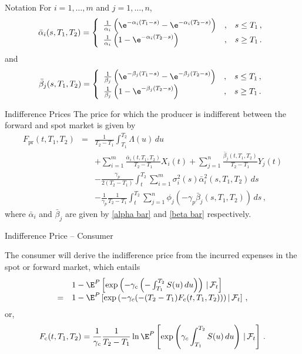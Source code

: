 {Notation}
For $i=1,\ldots,m$ and $j=1,\ldots,n$,
\begin{equation}\label{alpha bar}
\bar{\alpha}_i(s,T_1,T_2)=\left\{\begin{array}{lll}
\frac1{\alpha_i}\left(\e^{-\alpha_i(T_1-s)}-\e^{-\alpha_i(T_2-s)}\right) &
, &
s\leq T_1\,, \\
\frac1{\alpha_i}\left(1-\e^{-\alpha_i(T_2-s)}\right) & , & s\geq T_1\,.
\end{array}\right.
\end{equation}
and
\begin{equation}\label{beta bar}
\bar{\beta}_j(s,T_1,T_2)=\left\{\begin{array}{lll}
\frac1{\beta_j}\left(\e^{-\beta_j(T_1-s)}-\e^{-\beta_j(T_2-s)}\right) & ,
&
s\leq T_1\,, \\
\frac1{\beta_j}\left(1-\e^{-\beta_j(T_2-s)}\right) & , & s\geq T_1\,.
\end{array}\right.
\end{equation}

{Indifference Prices}
The price for which the producer is indifferent between the forward
and spot market is given by
\begin{eqnarray*}
F_{\text{pr}}(t,T_1,T_2)&=&\frac{1}{T_2-T_1}\int_{T_1}^{T_2}\Lambda(u)\,du\\
&&+\sum_{i=1}^m\frac{\bar{\alpha}_i(t,T_1,T_2)}{T_2-T_1}X_i(t)+\sum_{j=1}^n
\frac{\bar{\beta}_j(t,T_1,T_2)}{T_2-T_1}Y_j(t) \\
&&-\frac{\gamma_p}{2(T_2-T_1)}\int_t^{T_2}\sum_{i=1}^m
\sigma_i^2(s)\bar{\alpha}_i^2(s,T_1,T_2)\,ds
\\&&-\frac1{\gamma_p}\frac1{T_2-T_1}\int_t^{T_2}\sum_{j=1}^n
\phi_j\left(-\gamma_p\bar{\beta}_j(s,T_1,T_2)\right)\,ds\,,
\end{eqnarray*}
where $ \bar{\alpha}_i$ and $\bar{\beta}_j$ are given by
\eqref{alpha bar} and \eqref{beta bar} respectively.

{Indifference Price -- Consumer}

The consumer will derive the indifference price from the incurred expenses
in the spot or forward market, which entails
$$
\begin{array}{ll}
&1-\E^P\left[\exp\left(-\gamma_c\left(-\int_{T_1}^{T_2}S(u)\,du\right)\right)
\,|\,\mathcal{F}_t\right]\\
= &1-\E^P\left[\exp\left(-\gamma_c(-(T_2-T_1)F_{\text{c}}(t,T_1,T_2)\right))\,|\,
\mathcal{F}_t\right]\,,
\end{array}
$$
or,
\begin{equation}
F_{\text{c}}(t,T_1,T_2)=\frac1{\gamma_c}\frac1{T_2-T_1}\ln\E^P\left[
\exp\left(\gamma_c\int_{T_1}^{T_2}S(u)\,du\right)\,|\,\mathcal{F}_t\right]\,.
\end{equation}

